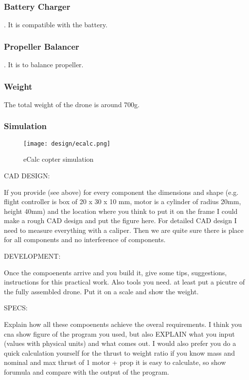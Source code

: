 \subsubsection{Battery Charger}
\cite{bangood_battery_charger}. It is compatible with the battery.

\subsubsection{Propeller Balancer}
\cite{bangood_prop_balancer}. It is to balance propeller.

\subsubsection{Weight}
The total weight of the drone is around 700g.

\subsubsection{Simulation}
\begin{figure}[!ht]
    \centering
    \texttt{[image: design/ecalc.png]}
    \caption{eCalc copter simulation}
    \label{fig:ecalc}
\end{figure}


CAD DESIGN:

If you provide (see above) for every component the dimensions and shape (e.g. flight controller is box of 20 x 30 x 10 mm, motor is a cylinder of radius 20mm, height 40mm) and the location where you think to put it on the frame I could make a rough CAD design and put the figure here. For detailed CAD design I need to measure everything with a caliper. Then we are quite sure there is place for all components and no interference of components.


DEVELOPMENT:

Once the compoenents arrive and you build it, give some tips, suggestions, instructions for this practical work. Also tools you need. at least put a picutre of the fully assembled drone. Put it on a scale and show the weight.

SPECS:

Explain how all these compoenents achieve the overal requirements. I think you cna show figure of the program you used, but also EXPLAIN what you input (values with physical units) and what comes out. I would also prefer you do a quick calculation yourself for the thrust to weight ratio if you know mass and nominal and max thrust of 1 motor + prop it is easy to calculate, so show forumula and compare with the output of the program.


